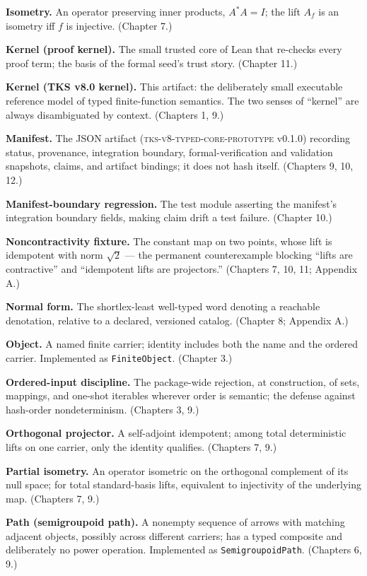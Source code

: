 \textbf{Isometry.} An operator preserving inner products,
$A^{*}A = I$; the lift $A_f$ is an isometry iff $f$ is injective.
(Chapter 7.)

\textbf{Kernel (proof kernel).} The small trusted core of Lean that
re-checks every proof term; the basis of the formal seed's trust
story. (Chapter 11.)

\textbf{Kernel (TKS v8.0 kernel).} This artifact: the deliberately
small executable reference model of typed finite-function semantics.
The two senses of ``kernel'' are always disambiguated by context.
(Chapters 1, 9.)

\textbf{Manifest.} The JSON artifact
(\textsc{tks-v8-typed-core-prototype} v0.1.0) recording status,
provenance, integration boundary, formal-verification and validation
snapshots, claims, and artifact bindings; it does not hash itself.
(Chapters 9, 10, 12.)

\textbf{Manifest-boundary regression.} The test module asserting the
manifest's integration boundary fields, making claim drift a test
failure. (Chapter 10.)

\textbf{Noncontractivity fixture.} The constant map on two points,
whose lift is idempotent with norm $\sqrt 2$ --- the permanent
counterexample blocking ``lifts are contractive'' and ``idempotent
lifts are projectors.'' (Chapters 7, 10, 11; Appendix A.)

\textbf{Normal form.} The shortlex-least well-typed word denoting a
reachable denotation, relative to a declared, versioned catalog.
(Chapter 8; Appendix A.)

\textbf{Object.} A named finite carrier; identity includes both the
name and the ordered carrier. Implemented as \texttt{FiniteObject}.
(Chapter 3.)

\textbf{Ordered-input discipline.} The package-wide rejection, at
construction, of sets, mappings, and one-shot iterables wherever
order is semantic; the defense against hash-order nondeterminism.
(Chapters 3, 9.)

\textbf{Orthogonal projector.} A self-adjoint idempotent; among total
deterministic lifts on one carrier, only the identity qualifies.
(Chapters 7, 9.)

\textbf{Partial isometry.} An operator isometric on the orthogonal
complement of its null space; for total standard-basis lifts,
equivalent to injectivity of the underlying map. (Chapters 7, 9.)

\textbf{Path (semigroupoid path).} A nonempty sequence of arrows with
matching adjacent objects, possibly across different carriers; has a
typed composite and deliberately no power operation. Implemented as
\texttt{SemigroupoidPath}. (Chapters 6, 9.)


